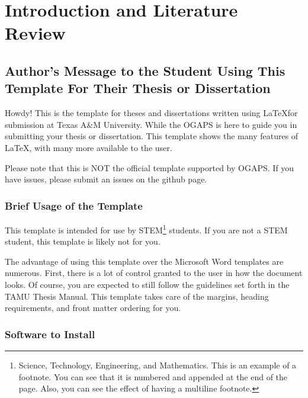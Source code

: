 

\chapter{Introduction and Literature Review}

\section{Author's Message to the Student Using This Template For Their Thesis or Dissertation}

Howdy! This is the template for theses and dissertations written using \LaTeX for submission at Texas A\&M University. While the \ac{OGAPS} is here to guide you in submitting your thesis or dissertation. This template shows the many features of \LaTeX, with many more available to the user.

Please note that this is NOT the official template supported by \ac{OGAPS}. If you have issues, please submit an issues on the github page.


\subsection{Brief Usage of the Template}

This template is intended for use by STEM\footnote{Science, Technology, Engineering, and Mathematics. This is an example of a footnote. You can see that it is numbered and appended at the end of the page. Also, you can see the effect of having a multiline footnote.} students. If you are not a STEM student, this template is likely not for you.

The advantage of using this template over the Microsoft Word templates are numerous. First, there is a lot of control granted to the user in how the document looks. Of course, you are expected to still follow the guidelines set forth in the TAMU Thesis Manual. This template takes care of the margins, heading requirements, and front matter ordering for you.


\subsection*{Software to Install}

